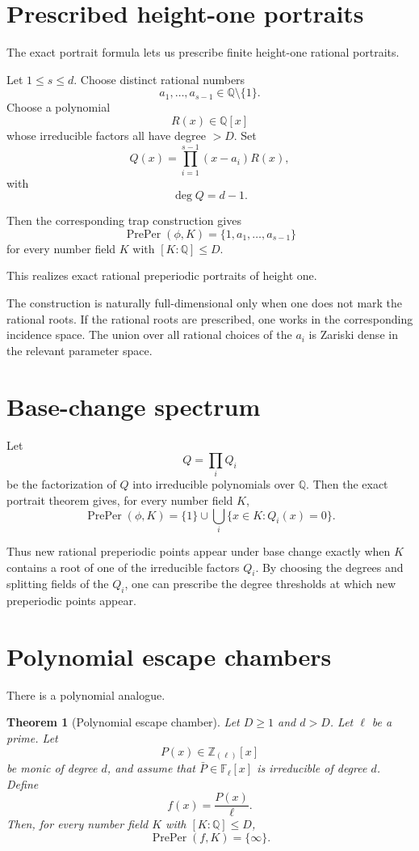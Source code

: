 \documentclass[11pt]{article}
\newtheorem{theorem}{Theorem}[section]
\begin{document}
\section{Prescribed height-one portraits}

The exact portrait formula lets us prescribe finite height-one rational portraits.

Let \(1\le s\le d\). Choose distinct rational numbers
\[
a_1,\dots,a_{s-1}\in\mathbb Q\setminus\{1\}.
\]
Choose a polynomial
\[
R(x)\in\mathbb Q[x]
\]
whose irreducible factors all have degree \(>D\). Set
\[
Q(x)=\prod_{i=1}^{s-1}(x-a_i)R(x),
\]
with
\[
\deg Q=d-1.
\]

Then the corresponding trap construction gives
\[
\operatorname{PrePer}(\phi,K)=\{1,a_1,\dots,a_{s-1}\}
\]
for every number field \(K\) with \([K:\mathbb Q]\le D\).

This realizes exact rational preperiodic portraits of height one.

The construction is naturally full-dimensional only when one does not mark the rational roots. If the rational roots are prescribed, one works in the corresponding incidence space. The union over all rational choices of the \(a_i\) is Zariski dense in the relevant parameter space.

\section{Base-change spectrum}

Let
\[
Q=\prod_i Q_i
\]
be the factorization of \(Q\) into irreducible polynomials over \(\mathbb Q\). Then the exact portrait theorem gives, for every number field \(K\),
\[
\operatorname{PrePer}(\phi,K)
=
\{1\}\cup\bigcup_i\{x\in K:Q_i(x)=0\}.
\]

Thus new rational preperiodic points appear under base change exactly when \(K\) contains a root of one of the irreducible factors \(Q_i\). By choosing the degrees and splitting fields of the \(Q_i\), one can prescribe the degree thresholds at which new preperiodic points appear.

\section{Polynomial escape chambers}

There is a polynomial analogue.

\begin{theorem}[Polynomial escape chamber]
Let \(D\ge1\) and \(d>D\). Let \(\ell\) be a prime. Let
\[
P(x)\in\mathbb Z_{(\ell)}[x]
\]
be monic of degree \(d\), and assume that \(\bar P\in\mathbb F_\ell[x]\) is irreducible of degree \(d\). Define
\[
f(x)=\frac{P(x)}{\ell}.
\]
Then, for every number field \(K\) with \([K:\mathbb Q]\le D\),
\[
\operatorname{PrePer}(f,K)=\{\infty\}.
\]
\end{theorem}
\end{document}
